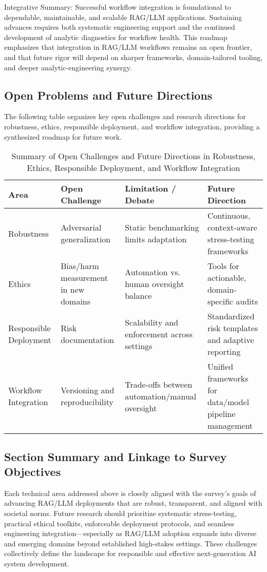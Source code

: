 \documentclass[sigconf]{acmart}
\begin{document}
Integrative Summary: Successful workflow integration is foundational to dependable, maintainable, and scalable RAG/LLM applications. Sustaining advances requires both systematic engineering support and the continued development of analytic diagnostics for workflow health. This roadmap emphasizes that integration in RAG/LLM workflows remains an open frontier, and that future rigor will depend on sharper frameworks, domain-tailored tooling, and deeper analytic-engineering synergy.

\subsection{Open Problems and Future Directions}
The following table organizes key open challenges and research directions for robustness, ethics, responsible deployment, and workflow integration, providing a synthesized roadmap for future work.

\begin{table*}[htbp]
\centering
\caption{Summary of Open Challenges and Future Directions in Robustness, Ethics, Responsible Deployment, and Workflow Integration}
\label{tab:open_challenges}
\begin{adjustbox}{max width=\textwidth}
\begin{tabular}{@{}llll@{}}
\toprule
\textbf{Area} & \textbf{Open Challenge} & \textbf{Limitation / Debate} & \textbf{Future Direction} \\
\midrule
Robustness & Adversarial generalization & Static benchmarking limits adaptation & Continuous, context-aware stress-testing frameworks \\
Ethics & Bias/harm measurement in new domains & Automation vs. human oversight balance & Tools for actionable, domain-specific audits \\
Responsible Deployment & Risk documentation & Scalability and enforcement across settings & Standardized risk templates and adaptive reporting \\
Workflow Integration & Versioning and reproducibility & Trade-offs between automation/manual oversight & Unified frameworks for data/model pipeline management \\
\bottomrule
\end{tabular}
\end{adjustbox}
\end{table*}

\subsection*{Section Summary and Linkage to Survey Objectives}
Each technical area addressed above is closely aligned with the survey's goals of advancing RAG/LLM deployments that are robust, transparent, and aligned with societal norms. Future research should prioritize systematic stress-testing, practical ethical toolkits, enforceable deployment protocols, and seamless engineering integration—especially as RAG/LLM adoption expands into diverse and emerging domains beyond established high-stakes settings. These challenges collectively define the landscape for responsible and effective next-generation AI system development.
\end{document}
